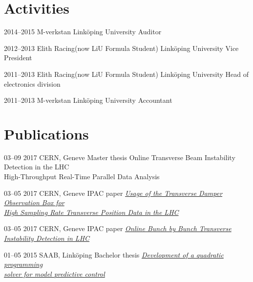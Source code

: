\documentclass[]{cv-style}          %
\begin{document}
\section{Activities}

\begin{entrylist}
  \entry
    {2014–2015}
    {M-verkstan}
    {Linköping University}
    {Auditor}

  \entry
    {2012–2013}
    {Elith Racing(now LiU Formula Student)}
    {Linköping University}
    {Vice President}

  \entry
    {2011–2013}
    {Elith Racing(now LiU Formula Student)}
    {Linköping University}
    {Head of electronics division}

  \entry
    {2011–2013}
    {M-verkstan}
    {Linköping University}
    {Accountant}

\end{entrylist}


\section{Publications}
\begin{entrylist}  
   
      \entry
    {03–09 2017}
    {CERN, Geneve}
    {Master thesis}
    {\emph{}{Online Transverse Beam Instability Detection in the LHC\\High-Throughput Real-Time Parallel Data Analysis}}

      \entry
    {03–05 2017}
    {CERN, Geneve}
    {IPAC paper}
    {\emph{\href{http://accelconf.web.cern.ch/AccelConf/ipac2017/papers/mopab117.pdf}{Usage of the Transverse Damper Observation Box for \\High Sampling Rate Transverse Position Data in the LHC}}}

  \entry
    {03–05 2017}
    {CERN, Geneve}
    {IPAC paper}
    {\emph{\href{http://accelconf.web.cern.ch/AccelConf/ipac2017/papers/mopab117.pdf}{Online Bunch by Bunch Transverse Instability Detection in LHC}}}
  

  \entry
    {01–05 2015}
    {SAAB, Linköping}
    {Bachelor thesis}
    {\emph{\href{http://liu.diva-portal.org/smash/get/diva2:844414/FULLTEXT01.pdf}{Development of a quadratic programming \\ solver for model predictive control}}}
   
    
\end{entrylist}
\end{document}
